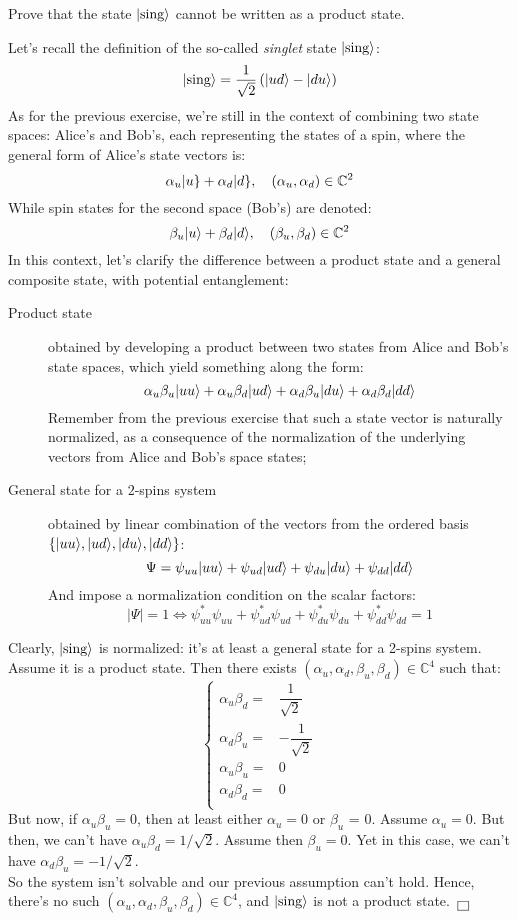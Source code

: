 \documentclass[solutions.tex]{subfiles}
\begin{document}
\maketitle
\begin{exercise} Prove that the state $\ket{\text{sing}}$ cannot
be written as a product state.
\end{exercise}
Let's recall the definition of the so-called \textit{singlet} state
$\ket{\text{sing}}$:
\[
	\ket{\text{sing}} = \frac1{\sqrt2}\left(\ket{ud}-\ket{du}\right)
\]
As for the previous exercise, we're still in the context of combining
two state spaces: Alice's and Bob's, each representing the states of a
spin, where the general form of Alice's state vectors is:
\[
	\alpha_u\keit{u} + \alpha_d\keit{d},\quad (\alpha_u, \alpha_d)\in\mathbb{C}^2
\]
While spin states for the second space (Bob's) are denoted:
\[
	\beta_u\ket{u} + \beta_d\ket{d},\quad (\beta_u, \beta_d)\in\mathbb{C}^2
\]
In this context, let's clarify the difference between a product state and a
general composite state, with potential entanglement:
\begin{description}
	\item[Product state] obtained by developing a product between
	two states from Alice and Bob's state spaces, which yield something
	along the form:
	\[
		\alpha_u\beta_u\ket{uu}+\alpha_u\beta_d\ket{ud}
			+\alpha_d\beta_u\ket{du}+\alpha_d\beta_d\ket{dd}
	\]
	Remember from the previous exercise that such a state vector
	is naturally normalized, as a consequence of the normalization
	of the underlying vectors from Alice and Bob's space states;
	\item[General state for a $2$-spins system] obtained by linear
	combination of the vectors from the ordered basis
	$\{\ket{uu}, \ket{ud}, \ket{du}, \ket{dd}\}$:
	\[
		\Psi = \psi_{uu}\ket{uu} + \psi_{ud}\ket{ud}
			+ \psi_{du}\ket{du} + \psi_{dd}\ket{dd}
	\]
	And impose a normalization condition on the scalar factors:
	\[
		|\Psi| = 1 \Leftrightarrow \psi_{uu}^*\psi_{uu}
			+ \psi_{ud}^*\psi_{ud} + \psi_{du}^*\psi_{du}
			+ \psi_{dd}^*\psi_{dd} = 1
	\]
\end{description}
Clearly, $\ket{\text{sing}}$ is normalized: it's at least a
general state for a 2-spins system. Assume it is a product state.
Then there exists $(\alpha_u, \alpha_d, \beta_u, \beta_d)\in\mathbb{C}^4$
such that:
\[
	\begin{cases}
		\alpha_u\beta_d =& \dfrac1{\sqrt2} \\
		\alpha_d\beta_u =& -\dfrac1{\sqrt2} \\
		\alpha_u\beta_u =& 0 \\
		\alpha_d\beta_d =& 0 \\
	\end{cases}
\]
But now, if $\alpha_u\beta_u = 0$, then at least either $\alpha_u = 0$ or
$\beta_u$ = 0. Assume $\alpha_u = 0$. But then, we can't have $\alpha_u\beta_d = 1/\sqrt2$.
Assume then $\beta_u = 0$. Yet in this case, we can't have $\alpha_d\beta_u = -1/\sqrt2$. \\

So the system isn't solvable and our previous assumption can't hold. Hence,
there's no such $(\alpha_u, \alpha_d, \beta_u, \beta_d)\in\mathbb{C}^4$, and
$\ket{\text{sing}}$ is not a product state. $\qed$
\end{document}
